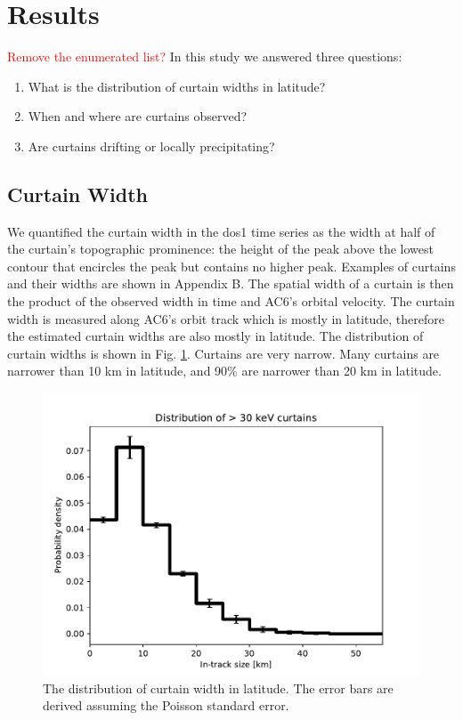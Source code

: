 \documentclass[draft]{agujournal2019}
\begin{document}
\section{Results} \label{results}
\textcolor{red}{Remove the enumerated list?}
In this study we answered three questions:

\begin{enumerate}
\item What is the distribution of curtain widths in latitude?
\item When and where are curtains observed?
\item Are curtains drifting or locally precipitating?
\end{enumerate}

\subsection{Curtain Width}
We quantified the curtain width in the dos1 time series as the width at half of the curtain's topographic prominence: the height of the peak above the lowest contour that encircles the peak but contains no higher peak. Examples of curtains and their widths are shown in Appendix B. The spatial width of a curtain is then the product of the observed width in time and AC6's orbital velocity. The curtain width is measured along AC6's orbit track which is mostly in latitude, therefore the estimated curtain widths are also mostly in latitude. The distribution of curtain widths is shown in Fig. \ref{width_dist}. Curtains are very narrow. Many curtains are narrower than 10 km in latitude, and 90\% are narrower than 20 km in latitude.

\begin{figure}
\includegraphics[width=\textwidth]{ac6_curtain_width_dist.pdf}
\caption{The distribution of curtain width in latitude. The error bars are derived assuming the Poisson standard error.}
\label{width_dist}
\end{figure}
\end{document}
